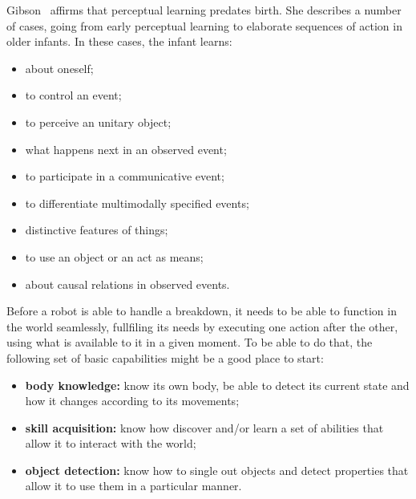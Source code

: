 \documentclass{article}
\begin{document}

Gibson~\cite{gibson2000} affirms that perceptual learning predates birth. She
describes a number of cases, going from early perceptual learning to elaborate
sequences of action in older infants. In these cases, the infant learns:

\begin{itemize}
\item about oneself;
\item to control an event;
\item to perceive an unitary object;
\item what happens next in an observed event;
\item to participate in a communicative event;
\item to differentiate multimodally specified events;
\item distinctive features of things;
\item to use an object or an act as means;
\item about causal relations in observed events.
\end{itemize}


Before a robot is able to handle a breakdown, it needs to be able to function in
the world seamlessly, fullfiling its needs by executing one action after the
other, using what is available to it in a given moment. To be able to do that,
the following set of basic capabilities might be a good place to start:

\begin{itemize}
\item \textbf{body knowledge:} know its own body, be able to detect its current
state and how it changes according to its movements;
\item \textbf{skill acquisition:} know how discover and/or learn a set of
abilities that allow it to interact with the world;
\item \textbf{object detection:} know how to single out objects and detect
properties that allow it to use them in a particular manner.
\end{itemize}



\end{document}
